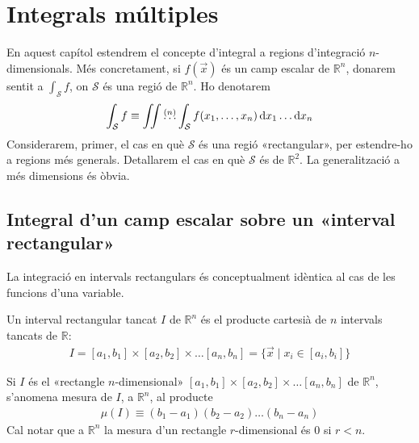 \section{Integrals múltiples}
En aquest capítol estendrem el concepte d'integral a regions d'integració $n$-dimensionals. Més concretament, si $f(\vec{x})$ és un camp escalar de $\mathbb{R}^{n}$, donarem sentit a $\displaystyle \int_{\mathcal{S}}f$, on $\mathcal{S}$ és una regió de $\mathbb{R}^{n}$. Ho denotarem
\begin{align*}
	\int_{\mathcal{S}} f \equiv \iint \overset{(n)}{\dots} \int_{\mathcal{S}} f(x_{1}, \dots, x_{n}) \mathop{}\!\mathrm{d} x_{1} \dots \mathrm{d} x_{n}
\end{align*}
Considerarem, primer, el cas en què $\mathcal{S}$ és una regió «rectangular», per estendre-ho a regions més generals. Detallarem el cas en què $\mathcal{S}$ és de $\mathbb{R}^{2}$. La generalització a més dimensions és òbvia.

\subsection{Integral d'un camp escalar sobre un «interval rectangular»}
La integració en intervals rectangulars és conceptualment idèntica al cas de les funcions d'una variable.
\begin{defi}
	Un interval rectangular tancat $I$ de $\mathbb{R}^{n}$ és el producte cartesià de $n$ intervals tancats de $\mathbb{R}$:
	\begin{align}
		I = [a_{1}, b_{1}] \times [a_{2}, b_{2}] \times \dots [a_{n}, b_{n}] = \{ \vec{x} \mid x_{i} \in [a_{i}, b_{i}] \}
	\end{align}
\end{defi}
\begin{defi}
	Si $I$ és el «rectangle $n$-dimensional» $[a_{1}, b_{1}] \times [a_{2}, b_{2}] \times \dots [a_{n}, b_{n}]$ de $\mathbb{R}^{n}$, s'anomena mesura de $I$, a $\mathbb{R}^{n}$, al producte
	\begin{align}
		\mu(I) \equiv (b_{1} - a_{1}) (b_{2} - a_{2}) \dots (b_{n} - a_{n})
	\end{align}
	Cal notar que a $\mathbb{R}^{n}$ la mesura d'un rectangle $r$-dimensional és 0 si $r<n$.
\end{defi}

